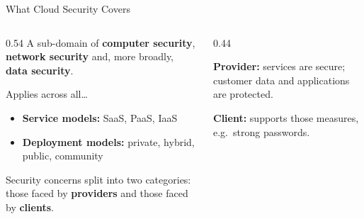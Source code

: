 \documentclass[11pt,aspectratio=169]{beamer}
\newcommand{\kw}[1]{\textbf{\color{accent}#1}}
\begin{document}
\begin{frame}{What Cloud Security Covers}
  \begin{columns}[T,onlytextwidth]
    \begin{column}{0.54\textwidth}
      \small
      A sub-domain of \kw{computer security}, \kw{network security} and,
      more broadly, \kw{data security}.
      \vspace{0.8em}

      Applies across all\dots
      \begin{itemize}\small
        \item \textbf{Service models:} SaaS, PaaS, IaaS
        \item \textbf{Deployment models:} private, hybrid, public, community
      \end{itemize}
      \vspace{0.8em}

      Security concerns split into two categories: those faced by
      \kw{providers} and those faced by \kw{clients}.
    \end{column}
    \begin{column}{0.44\textwidth}
      \centering

      \vspace{0.8em}
      {\scriptsize
      \textbf{Provider:} services are secure; customer data and
      applications are protected.\par
      \vspace{0.4em}
      \textbf{Client:} supports those measures, e.g.\ strong passwords.}
    \end{column}
  \end{columns}
\end{frame}
\end{document}
